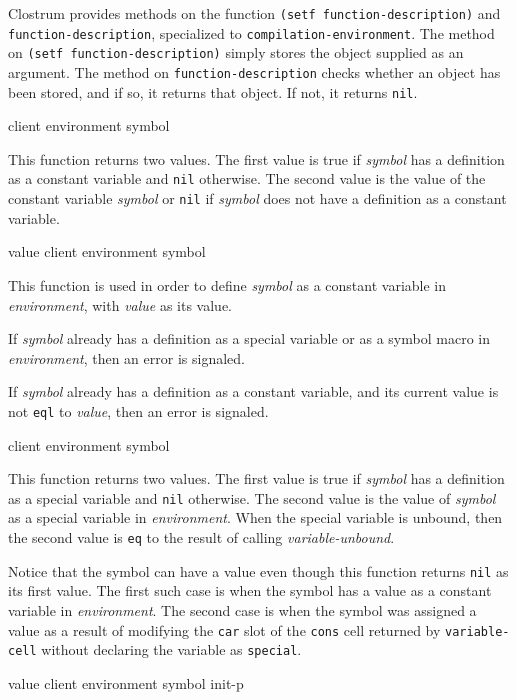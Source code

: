 Clostrum provides methods on the function \texttt{(setf
  function-description)} and \texttt{function-description},
specialized to \texttt{compilation-environment}.  The method on
\texttt{(setf function-description)} simply stores the object supplied
as an argument.  The method on \texttt{function-description} checks
whether an object has been stored, and if so, it returns that object.
If not, it returns \texttt{nil}.

 {client environment symbol}

This function returns two values. The first value is true if
\textit{symbol} has a definition as a constant variable and
\texttt{nil} otherwise. The second value is the value of the constant
variable \textit{symbol} or \texttt{nil} if \textit{symbol} does not
have a definition as a constant variable.

 {value client environment symbol}

This function is used in order to define \textit{symbol} as a constant
variable in \textit{environment}, with \textit{value} as its value.

If \textit{symbol} already has a definition as a special variable or
as a symbol macro in \textit{environment}, then an error is signaled.

If \textit{symbol} already has a definition as a constant variable,
and its current value is not \texttt{eql} to \textit{value}, then an
error is signaled.

 {client environment symbol}

This function returns two values. The first value is true if
\textit{symbol} has a definition as a special variable and
\texttt{nil} otherwise. The second value is the value of
\textit{symbol} as a special variable in \textit{environment}. When
the special variable is unbound, then the second value is \texttt{eq}
to the result of calling \textit{variable-unbound}.

Notice that the symbol can have a value even though this function
returns \texttt{nil} as its first value.  The first such case is when
the symbol has a value as a constant variable in \textit{environment}.
The second case is when the symbol was assigned a value as a result of
modifying the \texttt{car} slot of the \texttt{cons} cell returned by
\texttt{variable-cell} without declaring the variable as
\texttt{special}.

 {value client environment symbol init-p}

